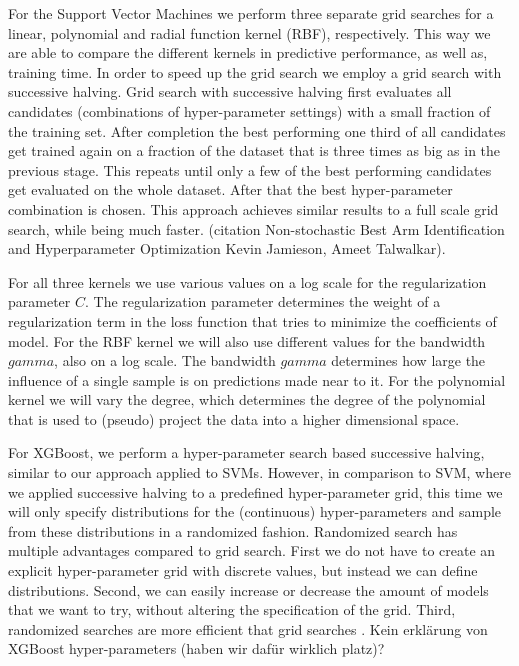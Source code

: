 For the Support Vector Machines we perform three separate grid searches for a linear, polynomial and radial function kernel (RBF), respectively.
This way we are able to compare the different kernels in predictive performance, as well as, training time.
In order to speed up the grid search we employ a grid search with successive halving.
Grid search with successive halving first evaluates all candidates (combinations of hyper-parameter settings) with a small fraction of the training set.
After completion the best performing one third of all candidates get trained again on a fraction of the dataset that is three times as big as in the previous stage.
This repeats until only a few of the  best performing candidates get evaluated on the whole dataset.
After that the best hyper-parameter combination is chosen.
This approach achieves similar results to a full scale grid search, while being much faster. (citation Non-stochastic Best Arm Identification and Hyperparameter Optimization
Kevin Jamieson, Ameet Talwalkar).

For all three kernels we use various values on a log scale for the regularization parameter \(C\).
The regularization parameter determines the weight of a regularization term in the loss function that tries to minimize the coefficients of model.
For the RBF kernel we will also use different values for the bandwidth \(gamma\), also on a log scale.
The bandwidth \(gamma\) determines how large the influence of a single sample is on predictions made near to it.
For the polynomial kernel we will vary the degree, which determines the degree of the polynomial that is used to (pseudo) project the data into a higher dimensional space.

For XGBoost, we perform a hyper-parameter search based successive halving, similar to our approach applied to SVMs.
However, in comparison to SVM, where we applied successive halving to a predefined hyper-parameter grid, this time we will only specify distributions for the (continuous) hyper-parameters and sample from these distributions in a randomized fashion.
Randomized search has multiple advantages compared to grid search.
First we do not have to create an explicit hyper-parameter grid with discrete values, but instead we can define distributions. Second, we can easily increase or decrease the amount of models that we want to try, without altering the specification of the grid. Third, randomized searches are more efficient that grid searches .
Kein erklärung von XGBoost hyper-parameters (haben wir dafür wirklich platz)?



